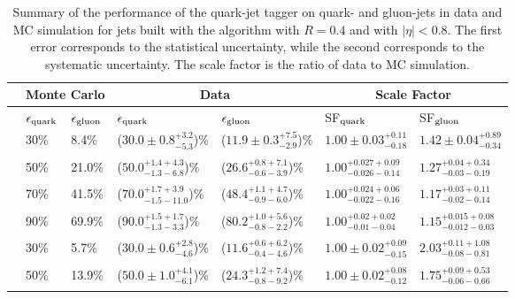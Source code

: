 \begin{table}[htbp]
\caption{
Summary of the performance of the quark-jet tagger on quark- and gluon-jets in data and \Pythia MC simulation for jets built with the \antikt algorithm with $R=0.4$ and with $|\eta|<0.8$. 
The first error corresponds to the statistical uncertainty, while the second corresponds to the systematic uncertainty.
The scale factor is the ratio of data to MC simulation. 
\label{tab:perfSummary}}
\begin{center}
\begin{tabular}{|c|l|l|l|l|l|l|}
\hline
& \multicolumn{2}{|c|}{Monte Carlo} & \multicolumn{2}{|c|}{Data} & \multicolumn{2}{|c|}{Scale Factor} \\ 
\hline
& $\epsilon_{\rm quark}$ & $\epsilon_{\rm gluon}$ & $\epsilon_{\rm quark}$ & $\epsilon_{\rm gluon}$ & SF$_{\rm quark}$ & SF$_{\rm gluon}$ \\
\hline\noalign{\smallskip}
\multirow{4}{*}{\begin{sideways}$\pt=60$--$80 \GeV$\end{sideways}} 
& 30\% &  8.4\% &  ($30.0\pm0.8^{+3.2}_{-5.3}$)\%    &  ($11.9\pm0.3^{+7.5}_{-2.9}$)\%    &  $1.00\pm0.03^{+0.11}_{-0.18}$ & $1.42\pm0.04^{+0.89}_{-0.34}$ \\&&&&&&\\
& 50\% & 21.0\% &  ($50.0^{+1.4+4.3}_{-1.3-6.8}$)\%  &  ($26.6^{+0.8+7.1}_{-0.6-3.9}$)\%  &  $1.00^{+0.027+0.09}_{-0.026-0.14}$ & $1.27^{+0.04+0.34}_{-0.03-0.19}$ \\&&&&&&\\
& 70\% & 41.5\% &  ($70.0^{+1.7+3.9}_{-1.5-11.0}$)\%  &  ($48.4^{+1.1+4.7}_{-0.9-6.0}$)\%  &  $1.00^{+0.024+0.06}_{-0.022-0.16}$ & $1.17^{+0.03+0.11}_{-0.02-0.14}$ \\&&&&&&\\
& 90\% & 69.9\% &  ($90.0^{+1.5+1.7}_{-1.3-3.3}$)\%  &  ($80.2^{+1.0+5.6}_{-0.8-2.2}$)\%   &  $1.00^{+0.02+0.02}_{-0.01-0.04}$ & $1.15^{+0.015+0.08}_{-0.012-0.03}$ \\&&&&&&\\
\hline\noalign{\smallskip}
\multirow{4}{*}{\begin{sideways}\centering$\pt=110$--$160 \GeV$\end{sideways}} 
& 30\% &  5.7\% &  ($30.0\pm0.6^{+2.8}_{-4.6}$)\%  & ($11.6^{+0.6+6.2}_{-0.4-4.6}$)\%   & $1.00\pm0.02^{+0.09}_{-0.15}$ & $2.03^{+0.11+1.08}_{-0.08-0.81}$ \\ &&&&&&\\
& 50\% & 13.9\% &  ($50.0\pm1.0^{+4.1}_{-6.1}$)\%  & ($24.3^{+1.2+7.4}_{-0.8-9.2}$)\%   & $1.00\pm0.02^{+0.08}_{-0.12}$ & $1.75^{+0.09+0.53}_{-0.06-0.66}$ \\ &&&&&&\\

\end{tabular}
\end{center}
\end{table}

